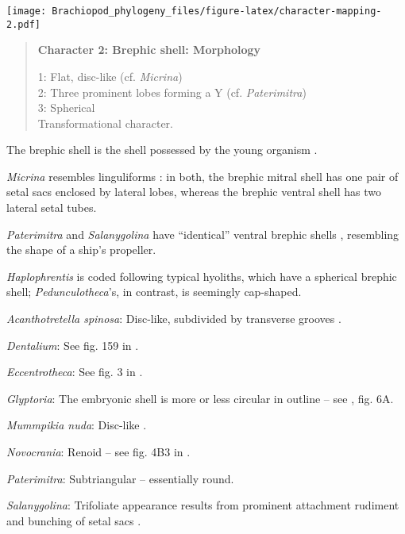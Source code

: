 \documentclass[openany]{book}
\theoremstyle{definition}
\theoremstyle{definition}
\theoremstyle{definition}
\theoremstyle{remark}
\begin{document}
\texttt{[image: Brachiopod\_phylogeny\_files/figure-latex/character-mapping-2.pdf]}

\begin{quote}
\textbf{Character 2: Brephic shell: Morphology}

1: Flat, disc-like (cf. \emph{Micrina})\\
2: Three prominent lobes forming a Y (cf. \emph{Paterimitra})\\
3: Spherical\\
Transformational character.
\end{quote}

The brephic shell is the shell possessed by the young organism
\citep[see][ and references therein for discussion of
terminology]{Ushatinskaya2016Revisionof}.

\emph{Micrina} resembles linguliforms \citep{Holmer2011Firstrecord}: in
both, the brephic mitral shell has one pair of setal sacs enclosed by
lateral lobes, whereas the brephic ventral shell has two lateral setal
tubes.

\emph{Paterimitra} and \emph{Salanygolina} have ``identical'' ventral
brephic shells \citep{Holmer2011Firstrecord}, resembling the shape of a
ship's propeller.

\emph{Haplophrentis} is coded following typical hyoliths, which have a
spherical brephic shell; \emph{Pedunculotheca}'s, in contrast, is
seemingly cap-shaped.

\hypertarget{Acanthotretella_spinosa-coding-2}{}
\emph{Acanthotretella spinosa}: Disc-like, subdivided by transverse
grooves \citep{Wanninger2002C}.

\hypertarget{Dentalium-coding-2}{}
\emph{Dentalium}: See fig. 159 in \citet{Williams1997Introduction}.

\hypertarget{Eccentrotheca-coding-2}{}
\emph{Eccentrotheca}: See fig. 3 in \citet{Bassett2017Earliestontogeny}.

\hypertarget{Glyptoria-coding-2}{}
\emph{Glyptoria}: The embryonic shell is more or less circular in
outline -- see \citet{Freeman1999Changesin}, fig. 6A.

\hypertarget{Mummpikia_nuda-coding-2}{}
\emph{Mummpikia nuda}: Disc-like \citep{Li2004}.

\hypertarget{Novocrania-coding-2}{}
\emph{Novocrania}: Renoid -- see fig. 4B3 in
\citet{Topper2013Theoldest}.

\hypertarget{Paterimitra-coding-2}{}
\emph{Paterimitra}: Subtriangular -- essentially round.

\hypertarget{Salanygolina-coding-2}{}
\emph{Salanygolina}: Trifoliate appearance results from prominent
attachment rudiment and bunching of setal sacs
\citep{Balthasar2009Thebrachiopod}.
\end{document}
